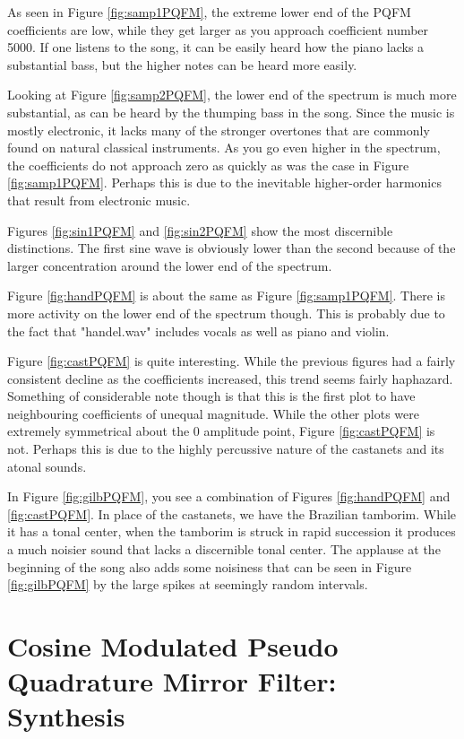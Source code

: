 \documentclass{article} %
\begin{document}
As seen in Figure \ref{fig:samp1PQFM}, the extreme lower end of the PQFM
coefficients are low, while they get larger as you approach coefficient number
5000. If one listens to the song, it can be easily heard how the piano lacks
a substantial bass, but the higher notes can be heard more easily. 

Looking at Figure \ref{fig:samp2PQFM}, the lower end of the spectrum is much
more substantial, as can be heard by the thumping bass in the song. Since the
music is mostly electronic, it lacks many of the stronger overtones that are
commonly found on natural classical instruments. As you go even higher in the
spectrum, the coefficients do not approach zero as quickly as was the case
in Figure \ref{fig:samp1PQFM}. Perhaps this is due to the inevitable 
higher-order harmonics that result from electronic music. 

Figures \ref{fig:sin1PQFM} and \ref{fig:sin2PQFM} show the most discernible
distinctions. The first sine wave is obviously lower than the second because
of the larger concentration around the lower end of the spectrum. 

Figure \ref{fig:handPQFM} is about the same as Figure \ref{fig:samp1PQFM}. There
is more activity on the lower end of the spectrum though. This is probably due
to the fact that "handel.wav" includes vocals as well as piano and violin. 


Figure \ref{fig:castPQFM} is quite interesting. While the previous figures had
a fairly consistent decline as the coefficients increased, this trend
seems fairly haphazard. Something of considerable note though is that
this is the first plot to have neighbouring coefficients of unequal magnitude.
While the other plots were extremely symmetrical about the 0 amplitude point, 
Figure \ref{fig:castPQFM} is not. Perhaps this is due to the highly percussive
nature of the castanets and its atonal sounds. 

In Figure \ref{fig:gilbPQFM}, you see a combination of Figures \ref{fig:handPQFM}
and \ref{fig:castPQFM}. In place of the castanets, we have the Brazilian 
tamborim. While it has a tonal center, when the tamborim is struck in rapid
succession it produces a much noisier sound that lacks a discernible tonal
center. The applause at the beginning of the song also adds some noisiness
that can be seen in Figure \ref{fig:gilbPQFM} by the large spikes at seemingly
random intervals. 




\section{Cosine Modulated Pseudo Quadrature Mirror Filter: Synthesis}
\end{document}
